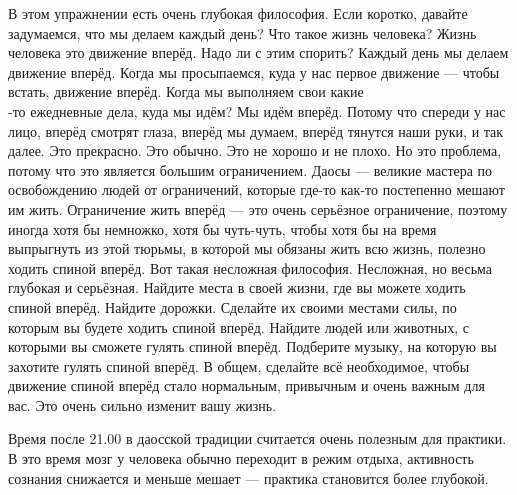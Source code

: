 В этом упражнении есть очень глубокая философия.
Если коротко, давайте задумаемся, что мы делаем каждый день? Что такое жизнь
человека? Жизнь человека это движение вперёд. Надо ли с этим спорить? Каждый день
мы делаем движение вперёд. Когда мы просыпаемся, куда у нас первое движение --- чтобы
встать, движение вперёд. Когда мы выполняем свои какие\\-то ежедневные дела,
куда мы идём? Мы идём вперёд. Потому что спереди у нас лицо, вперёд смотрят глаза,
вперёд мы думаем, вперёд тянутся наши руки, и так далее. Это прекрасно. Это обычно.
Это не хорошо и не плохо. Но это проблема, потому что это является большим
ограничением. Даосы --- великие мастера по освобождению людей от ограничений,
которые где-то как-то постепенно мешают им жить.
Ограничение жить вперёд --- это очень серьёзное ограничение, поэтому иногда хотя бы
немножко, хотя бы чуть-чуть, чтобы хотя бы на время выпрыгнуть из этой тюрьмы, в которой
мы обязаны жить всю жизнь, полезно ходить спиной вперёд. Вот такая несложная
философия. Несложная, но весьма глубокая и серьёзная. Найдите места в своей жизни,
где вы можете ходить спиной вперёд.
Найдите дорожки. Сделайте их своими местами силы, по которым вы будете ходить
спиной вперёд. Найдите людей или животных, с которыми вы сможете гулять спиной вперёд.
Подберите музыку, на которую вы захотите гулять спиной вперёд. В общем, сделайте всё
необходимое, чтобы движение спиной вперёд стало нормальным, привычным и очень
важным для вас.
Это очень сильно изменит вашу жизнь.

\bigskip

\adviceF
Время после 21.00 в даосской традиции считается очень полезным для практики.
В это время мозг у человека обычно переходит в режим отдыха, активность сознания
снижается и меньше мешает --- практика становится более глубокой.

\bye
